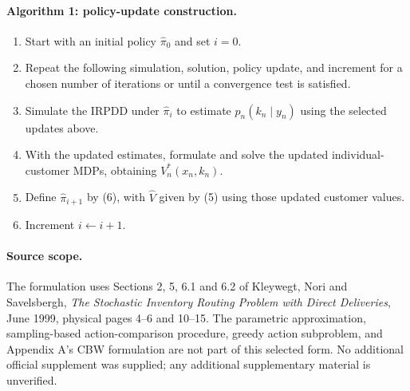 \documentclass{article}
\begin{document}
\paragraph{Algorithm 1: policy-update construction.}
\begin{enumerate}
\item Start with an initial policy $\hat\pi_0$ and set $i=0$.
\item Repeat the following simulation, solution, policy update, and increment for a chosen number of iterations or until a convergence test is satisfied.
\item Simulate the IRPDD under $\hat\pi_i$ to estimate $p_n(k_n\mid y_n)$ using the selected updates above.
\item With the updated estimates, formulate and solve the updated individual-customer MDPs, obtaining $V_n^*(x_n,k_n)$.
\item Define $\hat\pi_{i+1}$ by (6), with $\hat V$ given by (5) using those updated customer values.
\item Increment $i\leftarrow i+1$.
\end{enumerate}

\paragraph{Source scope.}
The formulation uses Sections 2, 5, 6.1 and 6.2 of Kleywegt, Nori and Savelsbergh, \emph{The Stochastic Inventory Routing Problem with Direct Deliveries}, June 1999, physical pages 4--6 and 10--15. The parametric approximation, sampling-based action-comparison procedure, greedy action subproblem, and Appendix A's CBW formulation are not part of this selected form. No additional official supplement was supplied; any additional supplementary material is unverified.
\end{document}
